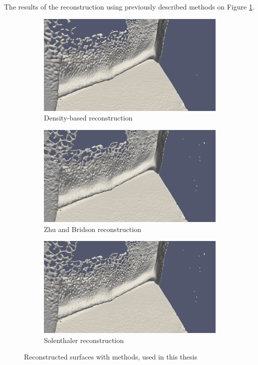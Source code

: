 The results of the reconstruction using previously described methods on Figure \ref{fig:rec_methods}.
\begin{figure}
	\begin{subfigure}[b]{\textwidth}
		\includegraphics[width=\textwidth]{figures/DencityBasedReconstruction.png}
		\caption{Density-based reconstruction \cite{DencRec}}
	\end{subfigure}
	\begin{subfigure}[b]{\textwidth}
		\includegraphics[width=\textwidth]{figures/ZhuBridsonReconstruction.png}
		\caption{Zhu and Bridson reconstruction \cite{ZhuBridson}}

	\end{subfigure}
	\begin{subfigure}[b]{\textwidth}
		\includegraphics[width=\textwidth]{figures/SolenthilerReconstruction.png}
		\caption{Solenthaler reconstruction \cite{Solenthaler}}

	\end{subfigure}
	\caption{Reconstructed surfaces with methods, used in this thesis }
	\label{fig:rec_methods}
\end{figure}

